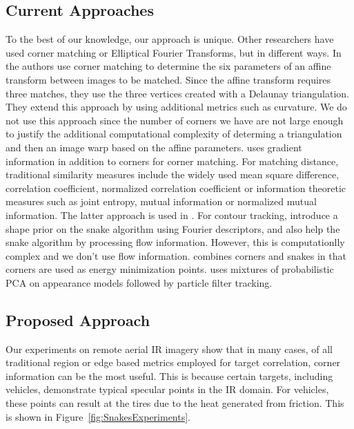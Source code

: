 \documentclass{article}
\begin{document}
\subsection{Current Approaches}
To the best of our knowledge, our approach is unique.  Other researchers have used corner matching or Elliptical Fourier Transforms, but in different ways.  In \cite{2007_CNF_CornerMatching_Awrangjeb} the authors use corner matching to determine the six parameters of an affine transform between images to be matched.  Since the affine transform requires three matches, they use the three vertices created with a Delaunay triangulation.  They extend this approach by using additional metrics such as curvature.  We do not use this approach since the number of corners we have are not large enough to justify the additional computational complexity of determing a triangulation and then an image warp based on the affine parameters.  \cite{2008_CNF_CornerMatching_Yu} uses gradient information in addition to corners for corner matching.  For matching distance, traditional similarity measures include the widely used mean square difference, correlation coefficient, normalized correlation coefficient or information theoretic measures such as joint entropy, mutual information or normalized mutual information.    The latter approach is used in \cite{2004_CNF_GraphCornerMatching_Lourakis}.  For contour tracking, \cite{2006_CNF_FourierSnakes_Derrode} introduce a shape prior on the snake algorithm using Fourier descriptors, and \cite{2001_CNF_SnakeTracking_Kim} also help the snake algorithm by processing flow information.  However, this is computationlly complex and we don't use flow information.  \cite{2001_CNF_SnakeTracking_Kim} combines corners and snakes in that corners are used as energy minimization points.  \cite{2006_CNF_IRtracking_Mei} uses mixtures of probabilistic PCA on appearance models followed by particle filter tracking.
		
\subsection{Proposed Approach}
Our experiments on remote aerial IR imagery show that in many cases, of all traditional region or edge based metrics employed for target correlation, corner information can be the most useful.  This is because certain targets, including vehicles, demonstrate typical specular points in the IR domain.  For vehicles, these points can result at the tires due to the heat generated from friction.  This is shown in Figure~\ref{fig:SnakesExperiments}. 
\end{document}
